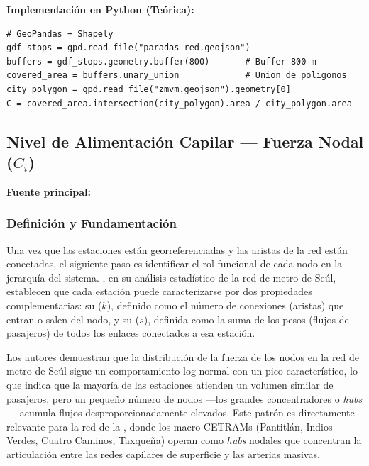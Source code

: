 \textbf{Implementación en Python (Teórica):}
 
\begin{lstlisting}[style=estiloPython, caption={Cálculo del indicador $C$ con GeoPandas.}, label={lst:cobertura}]
# GeoPandas + Shapely
gdf_stops = gpd.read_file("paradas_red.geojson")
buffers = gdf_stops.geometry.buffer(800)       # Buffer 800 m
covered_area = buffers.unary_union             # Union de poligonos
city_polygon = gpd.read_file("zmvm.geojson").geometry[0]
C = covered_area.intersection(city_polygon).area / city_polygon.area
\end{lstlisting}

\subsection{Nivel de Alimentación Capilar --- Fuerza Nodal \texorpdfstring{($C_i$)}{(Ci)}}
\label{subsec:alimentacion-capilar}

\textbf{Fuente principal:} \citet{lee2008}
 
\subsubsection{Definición y Fundamentación}
 
Una vez que las estaciones están georreferenciadas y las aristas de la red están
conectadas, el siguiente paso es identificar el rol funcional de cada nodo en la
jerarquía del sistema. \citet{lee2008}, en su análisis estadístico de la red
de
metro de Seúl, establecen que cada estación puede caracterizarse por dos
propiedades complementarias: su  ($k$), definido como el número
de
conexiones (aristas) que entran o salen del nodo, y su  ($s$),
definida como la suma de los pesos (flujos de pasajeros) de todos los enlaces
conectados a esa estación.
 
Los autores demuestran que la distribución de la fuerza de los nodos en la red
de
metro de Seúl sigue un comportamiento log-normal con un pico característico, lo
que
indica que la mayoría de las estaciones atienden un volumen similar de
pasajeros,
pero un pequeño número de nodos ---los grandes concentradores o
\textit{hubs}--- acumula flujos desproporcionadamente elevados. Este patrón es
directamente relevante para la red de la \cdmx{}, donde los macro-CETRAMs
(Pantitlán, Indios Verdes, Cuatro Caminos, Taxqueña) operan como \textit{hubs}
nodales que concentran la articulación entre las redes capilares de superficie y
las
arterias masivas.
 
